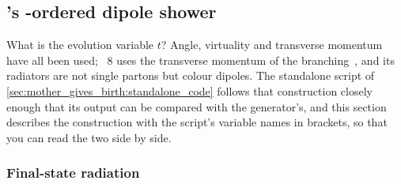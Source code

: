 \subsection{\PYTHIA's \texorpdfstring{\pt}{pT}-ordered dipole shower}
\label{sec:mother_gives_birth:dipole_shower}

What is the evolution variable $t$? Angle, virtuality and transverse
momentum have all been used; \PYTHIA~8 uses the transverse momentum of the
branching~\cite{Sjostrand:2004ef,Bierlich:2022pfr}, and its radiators are
not single partons but colour dipoles. The standalone script of
\cref{sec:mother_gives_birth:standalone_code} follows that construction
closely enough that its output can be compared with the generator's, and
this section describes the construction with the script's variable names in
brackets, so that you can read the two side by side.

\subsubsection{Final-state radiation}
\label{sec:mother_gives_birth:fsr}

